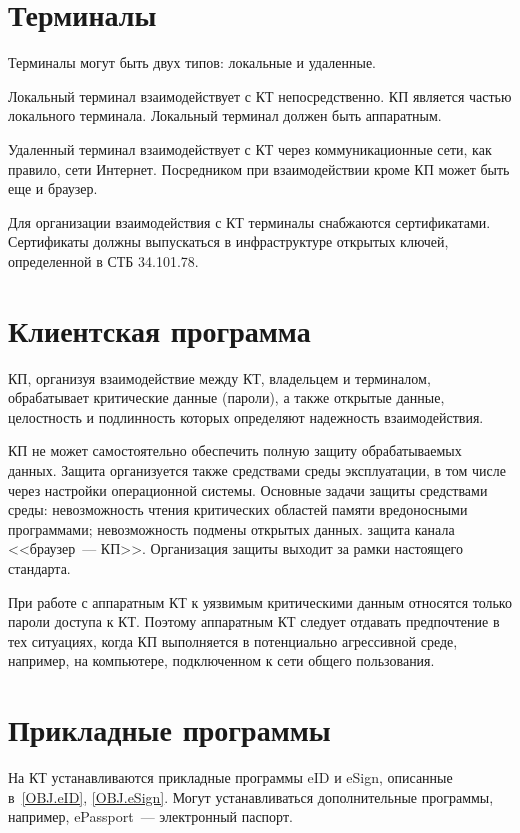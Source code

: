 \section{Терминалы}

Терминалы могут быть двух типов: локальные и удаленные.

Локальный терминал взаимодействует с КТ непосредственно. КП является 
частью локального терминала. Локальный терминал должен быть аппаратным.

Удаленный терминал взаимодействует с КТ через коммуникационные сети,
как правило, сети Интернет. Посредником при взаимодействии 
кроме КП может быть еще и браузер. 

Для организации взаимодействия с КТ терминалы снабжаются сертификатами.
Сертификаты должны выпускаться в инфраструктуре открытых ключей, 
определенной в СТБ 34.101.78.

\section{Клиентская программа}

КП, организуя взаимодействие между КТ, владельцем и терминалом,
обрабатывает критические данные (пароли), а также открытые данные, 
целостность и подлинность которых определяют надежность  
взаимодействия.

КП не может самостоятельно 
обеспечить полную защиту обрабатываемых данных. 
Защита организуется также средствами среды эксплуатации, 
в том числе через настройки операционной системы.  
%
Основные задачи защиты средствами среды: 
невозможность чтения критических областей памяти вредоносными программами; 
невозможность подмены открытых данных.
защита канала <<браузер~--- КП>>.
%
Организация защиты выходит за рамки настоящего стандарта.

При работе с аппаратным КТ к уязвимым критическими данным
относятся только пароли доступа к КТ. Поэтому аппаратным КТ следует отдавать 
предпочтение в тех ситуациях, когда КП выполняется в потенциально агрессивной 
среде, например, на компьютере, подключенном к сети общего пользования.

\section{Прикладные программы} 

На КТ устанавливаются прикладные программы eID и eSign,
описанные в~\ref{OBJ.eID}, \ref{OBJ.eSign}. Могут устанавливаться 
дополнительные программы, например, ePassport~--- электронный 
паспорт.

